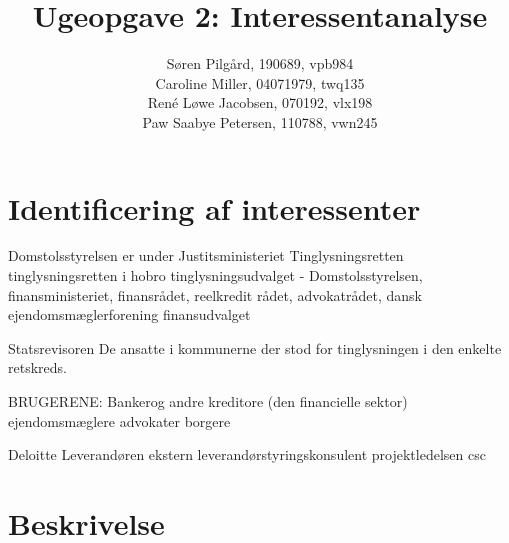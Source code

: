 \documentclass[10pt,a4paper,danish]{article}
\title{Ugeopgave 2: Interessentanalyse}
\author{Søren Pilgård, 190689, vpb984\\
Caroline Miller, 04071979, twq135\\
René Løwe Jacobsen, 070192, vlx198\\
Paw Saabye Petersen, 110788, vwn245}
\begin{document}
\maketitle
\newpage


\section{Identificering af interessenter}
Domstolsstyrelsen er under
Justitsministeriet
Tinglysningsretten
tinglysningsretten i hobro
tinglysningsudvalget - Domstolsstyrelsen, finansministeriet, finansrådet, reelkredit rådet, advokatrådet, dansk ejendomsmæglerforening
finansudvalget

Statsrevisoren
De ansatte i kommunerne der stod for tinglysningen i den enkelte retskreds.

BRUGERENE:
Bankerog andre kreditore (den financielle sektor)
ejendomsmæglere
advokater
borgere

Deloitte
Leverandøren
ekstern leverandørstyringskonsulent
projektledelsen
csc

\section{Beskrivelse}
\end{document}
